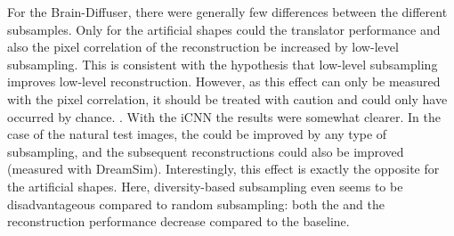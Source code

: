  For the Brain-Diffuser, there were generally few differences between the different subsamples. Only for the artificial shapes could the translator performance and also the pixel correlation of the reconstruction be increased by low-level subsampling. This is consistent with the hypothesis that low-level subsampling improves low-level reconstruction. However, as this effect can only be measured with the pixel correlation, it should be treated with caution and could only have occurred by chance. . With the iCNN the results were somewhat clearer. In the case of the natural test images, the  could be improved by any type of subsampling, and the subsequent reconstructions could also be improved (measured with DreamSim). Interestingly, this effect is exactly the opposite for the artificial shapes. Here, diversity-based subsampling even seems to be disadvantageous compared to random subsampling: both the  and the reconstruction performance decrease compared to the baseline. 

